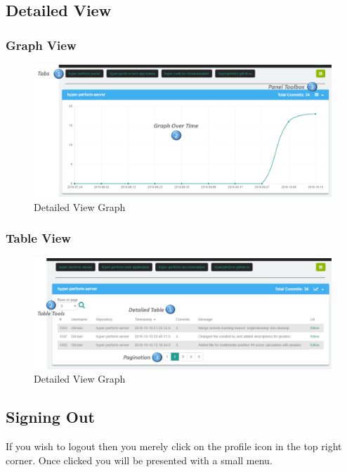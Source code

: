 \documentclass[11pt,a4paper]{article}
\begin{document}
\subsection{Detailed View}
\subsubsection{Graph View}
\begin{figure}[H]
	\begin{center}
		\includegraphics[scale=0.27]{../Images/Getting_Started/GitHub_Detailed_Graph_numbered}
		\caption{Detailed View Graph}
	\end{center}
\end{figure}

\subsubsection{Table View}
\begin{figure}[H]
	\begin{center}
		\includegraphics[scale=0.27]{../Images/Getting_Started/GitHub_Detailed_Table_numbered}
		\caption{Detailed View Graph}
	\end{center}
\end{figure}

\subsection{Signing Out}
If you wish to logout then you merely click on the profile icon in the top right corner. Once clicked you will be presented with a small menu. 
\end{document}
